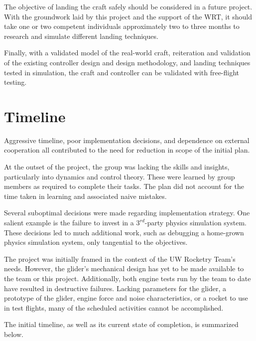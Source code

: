 \documentclass{sydeStyle}
\begin{document}
The objective of landing the craft safely should be considered in a future
project.  With the groundwork laid by this project and the support of the WRT,
it should take one or two competent individuals approximately two to three
months to research and simulate different landing techniques.

Finally, with a validated model of the real-world craft, reiteration and
validation of the existing controller design and design methodology, and landing
techniques tested in simulation, the craft and controller can be validated with
free-flight testing.

\appendix

\chapter{Timeline}


Aggressive timeline, poor implementation decisions, and dependence on external
cooperation all contributed to the need for reduction in scope of the initial
plan.

At the outset of the project, the group was lacking the skills and insights,
particularly into dynamics and control theory. These were learned by group
members as required to complete their tasks. The plan did not account for the
time taken in learning and associated naive mistakes.

Several suboptimal decisions were made regarding implementation strategy. One
salient example is the failure to invest in a $3^{rd}$-party physics simulation
system. These decisions led to much additional work, such as debugging a
home-grown physics simulation system, only tangential to the objectives.

The project was initially framed in the context of the UW Rocketry Team's needs.
However, the glider's mechanical design has yet to be made available to the team or
this project. Additionally, both engine tests run by the team to date have
resulted in destructive failures. Lacking parameters for the glider, a prototype
of the glider, engine force and noise characteristics, or a rocket to use in
test flights, many of the scheduled activities cannot be accomplished.

The initial timeline, as well as its current state of completion, is summarized
below.
\end{document}

